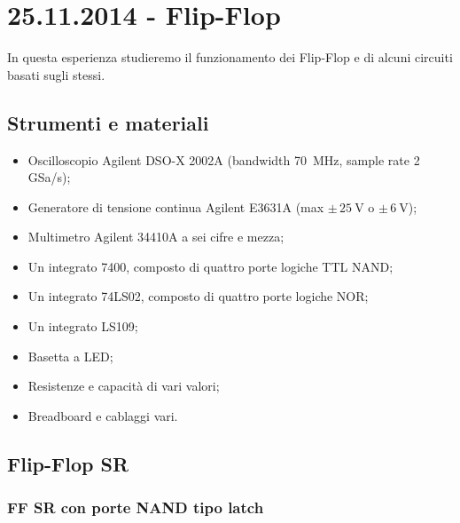 \section{25.11.2014 - Flip-Flop}

In questa esperienza studieremo il funzionamento dei Flip-Flop e di alcuni circuiti basati sugli stessi.

\subsection*{Strumenti e materiali}

\begin{itemize} [noitemsep]
	\item Oscilloscopio Agilent DSO-X 2002A (bandwidth \SI{70}{\mega\hertz}, sample rate \num{2} GSa/s);
	\item Generatore di tensione continua Agilent E3631A (max $\pm \, \SI{25}{\volt}$ o $\pm \, \SI{6}{\volt}$);
	\item Multimetro Agilent 34410A a sei cifre e mezza;
	\item Un integrato 7400, composto di quattro porte logiche TTL NAND; %
	\item Un integrato 74LS02, composto di quattro porte logiche NOR;
	\item Un integrato LS109;
	\item Basetta a LED;		
	\item Resistenze e capacità di vari valori;
	\item Breadboard e cablaggi vari.
\end{itemize}

\subsection{Flip-Flop SR}

\subsubsection*{FF SR con porte NAND tipo latch}


